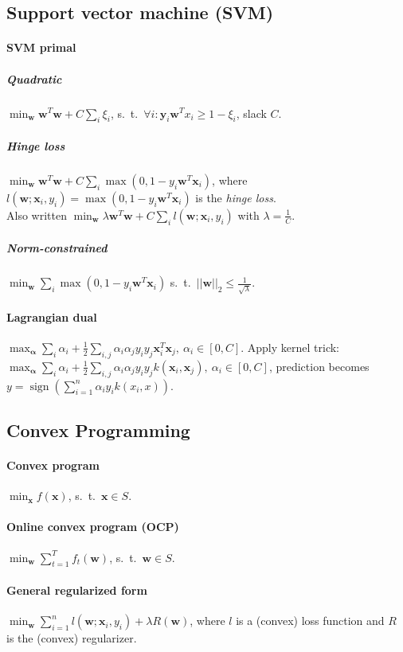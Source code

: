 \documentclass[a4paper, 9pt, DIV=24]{scrartcl}
\DeclareMathOperator{\sign}{sign}
\begin{document}
\begin{twocolumn}
\subsection{Support vector machine (SVM)}
\paragraph{SVM primal}
\subparagraph{Quadratic} $\min_{\bm w} \bm w^T \bm w + C\sum_{i}\xi_i$,
s.\ t.\ $\forall i: \bm y_i\bm w^T x_i \geq 1 - \xi_i$, slack $C$.
\subparagraph{Hinge loss} $\min_{\bm w} \bm w^T \bm w + C\sum_{i}\max(0,1-y_i\bm w^T\bm x_i)$,\newline
where $l(\bm w; \bm x_i, y_i) = \max(0,1-y_i\bm w^T \bm x_i)$ is the \emph{hinge loss}. \\
Also written $\min_{\bm w} \lambda \bm w^T \bm w + C\sum_{i}l(\bm w; \bm x_i, y_i)$ with $\lambda = \frac{1}{C}$.
\subparagraph{Norm-constrained}
$\min_{\bm w} \sum_{i}\max(0,1-y_i\bm w^T\bm x_i)$ s.\ t.\ $||\bm w||_2 \leq \frac{1}{\sqrt \lambda}$.
\paragraph{Lagrangian dual}
$\max_{\bm \alpha} \sum_{i}\alpha_i + \frac{1}{2}\sum_{i,j}\alpha_i\alpha_j y_i y_j \bm x_i^T\bm x_j,\ \alpha_i \in [0,C]$.
Apply kernel trick: 
$\max_{\bm \alpha} \sum_{i}\alpha_i + \frac{1}{2}\sum_{i,j}\alpha_i\alpha_j y_i y_j k(\bm x_i, \bm x_j),\ \alpha_i \in [0,C]$, prediction becomes $y = \sign(\sum_{i=1}^{n}\alpha_i y_i k(x_i,x))$.

\subsection{Convex Programming}
\paragraph{Convex program} $\min_{\bm x} f(\bm x)$, s.\ t.\ $\bm x \in S$.
\paragraph{Online convex program (OCP)} $\min_{\bm w} \sum_{t=1}^{T} f_t(\bm w)$, s.\ t.\ $\bm w \in S$.
\paragraph{General regularized form} $\min_{\bm w} \sum_{i=1}^{n} l(\bm w; \bm x_i, y_i) + \lambda R(\bm w)$, where $l$ is a (convex) loss function and $R$ is the (convex) regularizer.

\end{twocolumn}
\end{document}
